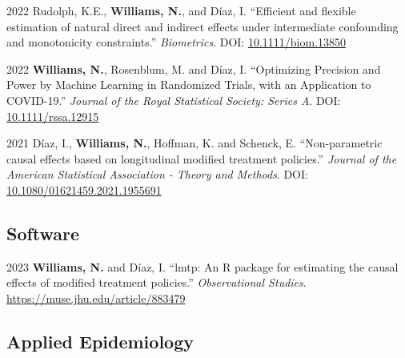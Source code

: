 \documentclass[12pt,letterpaper]{report}
\begin{document}
    \begin{tablist}
    
    	\item[2022] \tab Rudolph, K.E., \textbf{Williams, N.}, and Díaz, I. \enquote{Efficient and flexible estimation of natural direct and indirect effects under intermediate confounding and monotonicity constraints.} \textit{Biometrics}. DOI: \href{https://doi.org/10.1111/biom.13850}{10.1111/biom.13850}
    
        \item[2022] \tab \textbf{Williams, N.}, Rosenblum, M. and Díaz, I. \enquote {Optimizing Precision and Power by Machine Learning in Randomized Trials, with an Application to COVID-19.} \textit {Journal of the Royal Statistical Society: Series A}. DOI: \href{https://doi.org/10.1111/rssa.12915}{10.1111/rssa.12915}
    
       \item[2021] \tab Díaz, I., \textbf{Williams, N.}, Hoffman, K. and Schenck, E. \enquote{Non-parametric causal effects based on longitudinal modified treatment policies.} \textit{Journal of the American Statistical Association - Theory and Methods}. DOI: \href{https://doi.org/10.1080/01621459.2021.1955691}{10.1080/01621459.2021.1955691}
       
    \end{tablist}
    
    \subsection*{Software}
    
    \begin{tablist}
    
        \item[2023] \tab \textbf{Williams, N.} and Díaz, I. \enquote{lmtp: An R package for estimating the causal effects of modified treatment policies.} \textit{Observational Studies}. \url{https://muse.jhu.edu/article/883479}
    
    \end{tablist}

    \subsection*{Applied Epidemiology}
\end{document}
